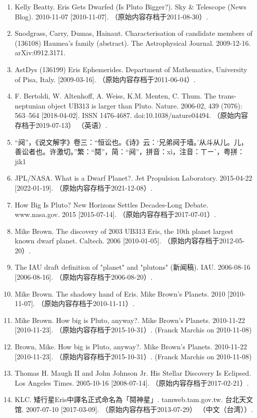 \begin{enumerate}
\item Kelly Beatty. Eris Gets Dwarfed (Is Pluto Bigger?). Sky & Telescope (News Blog). 2010-11-07 [2010-11-07]. （原始内容存档于2011-08-30）.
\item Snodgrass, Carry, Dumas, Hainaut. Characterisation of candidate members of (136108) Haumea's family (abstract). The Astrophysical Journal. 2009-12-16. arXiv:0912.3171.
\item AstDys (136199) Eris Ephemerides. Department of Mathematics, University of Pisa, Italy. [2009-03-16]. （原始内容存档于2011-06-04）.
\item F. Bertoldi, W. Altenhoff, A. Weiss, K.M. Menten, C. Thum. The trans-neptunian object UB313 is larger than Pluto. Nature. 2006-02, 439 (7076): 563–564 [2018-04-02]. ISSN 1476-4687. doi:10.1038/nature04494. （原始内容存档于2019-07-13） （英语）.
\item “阋”，《说文解字》卷三：“恒讼也。《诗》云：‘兄弟阋于墙。’从斗从儿。儿，善讼者也。许激切。”繁：“鬩”，简：“阋”，拼音：xì，注音：ㄒㄧˋ，粤拼：jik1
\item JPL/NASA. What is a Dwarf Planet?. Jet Propulsion Laboratory. 2015-04-22 [2022-01-19]. （原始内容存档于2021-12-08）.
\item How Big Is Pluto? New Horizons Settles Decades-Long Debate. www.nasa.gov. 2015 [2015-07-14]. （原始内容存档于2017-07-01）.
\item Mike Brown. The discovery of 2003 UB313 Eris, the 10th planet largest known dwarf planet. Caltech. 2006 [2010-01-05]. （原始内容存档于2012-05-20）.
\item The IAU draft definition of "planet" and "plutons" (新闻稿). IAU. 2006-08-16 [2006-08-16]. （原始内容存档于2006-08-20）.
\item Mike Brown. The shadowy hand of Eris. Mike Brown's Planets. 2010 [2010-11-07]. （原始内容存档于2010-11-11）.
\item Mike Brown. How big is Pluto, anyway?. Mike Brown's Planets. 2010-11-22 [2010-11-23]. （原始内容存档于2015-10-31）. (Franck Marchis on 2010-11-08)
\item Brown, Mike. How big is Pluto, anyway?. Mike Brown's Planets. 2010-11-22 [2010-11-23]. （原始内容存档于2015-10-31）. (Franck Marchis on 2010-11-08)
\item Thomas H. Maugh II and John Johnson Jr. His Stellar Discovery Is Eclipsed. Los Angeles Times. 2005-10-16 [2008-07-14]. （原始内容存档于2017-02-21）.
\item KLC. 矮行星Eris中譯名正式命名為「鬩神星」. tamweb.tam.gov.tw. 台北天文馆. 2007-07-10 [2017-03-09]. （原始内容存档于2013-07-29） （中文（台湾））.

\end{enumerate}
